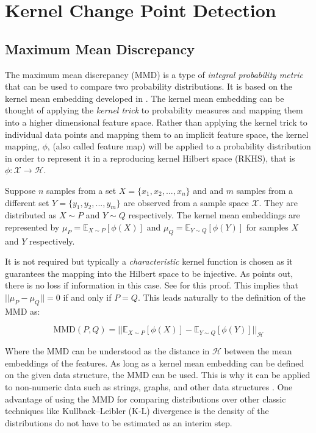 \chapter{Kernel Change Point Detection}

\section{Maximum Mean Discrepancy}
\label{mmd}
The maximum mean discrepancy (MMD) is a type of \textit{integral probability metric} that can be used to compare two probability distributions. It is based on the kernel mean embedding developed in \cite{smola2007hilbert}. The kernel mean embedding can be thought of applying the \textit{kernel trick} to probability measures and mapping them into a higher dimensional feature space. Rather than applying the kernel trick to individual data points and mapping them to an implicit feature space, the kernel mapping, $\phi$, (also called feature map) will be applied to a probability distribution in order to represent it in a reproducing kernel Hilbert space (RKHS), that is $\phi: \mathcal{X} \rightarrow \mathcal{H}$.

Suppose $n$ samples from a set $X = \{x_1, x_2, ..., x_n\}$ and and $m$ samples from a different set $Y=\{y_1, y_2, ..., y_m\}$ are observed from a sample space $\mathcal{X}$. They are distributed as $X \sim  P$ and $Y \sim Q$ respectively. The kernel mean embeddings are represented by $\mu_P = \mathbb{E}_{X \sim P}[\phi(X)] $ and $\mu_Q =\mathbb{E}_{Y \sim Q}[\phi(Y)]$ for samples $X$ and $Y$ respectively. 

It is not required but typically a \textit{characteristic} kernel function is chosen as it guarantees the mapping into the Hilbert space to be injective. As \cite{muandet2017kernel} points out, there is no loss if information in this case. See \cite{fukumizu2008kernel} for this proof. This implies that $||\mu_P - \mu_Q ||=0$ if and only if $P=Q$. This leads naturally to the definition of the MMD as:

\begin{equation}
\text{MMD}(P,Q)=|| \mathbb{E}_{X \sim P}[\phi(X)] -  \mathbb{E}_{Y \sim Q}[\phi(Y)]||_\mathcal{H}
\end{equation}

Where the MMD can be understood as the distance in $\mathcal{H}$ between the mean embeddings of the features. As long as a kernel mean embedding can be defined on the given data structure, the MMD can be used. This is why it can be applied to non-numeric data such as strings, graphs, and other data structures \cite{hofmann2008kernel}. One advantage of using the MMD for comparing distributions over other classic techniques like Kullback–Leibler (K-L) divergence is the density of the distributions do not have to be estimated as an interim step. 

